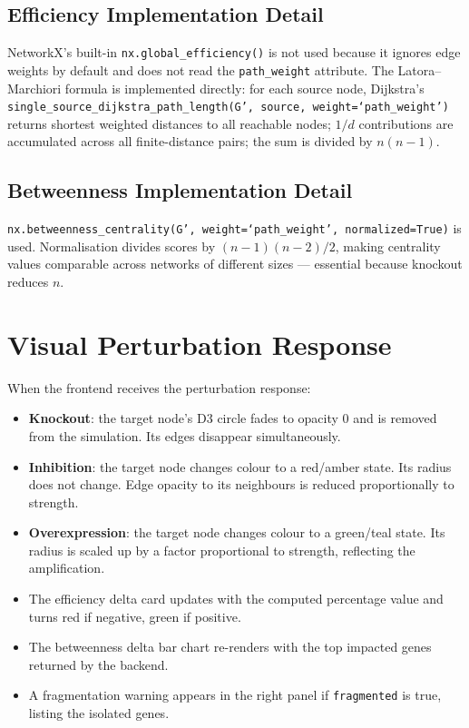 \documentclass[12pt,a4paper]{report}
\begin{document}
\subsection{Efficiency Implementation Detail}

NetworkX's built-in \texttt{nx.global\_efficiency()} is not used because it ignores edge weights by default and does not read the \texttt{path\_weight} attribute. The Latora--Marchiori formula is implemented directly: for each source node, Dijkstra's \texttt{single\_source\_dijkstra\_path\_length(G', source, weight=`path\_weight')} returns shortest weighted distances to all reachable nodes; $1/d$ contributions are accumulated across all finite-distance pairs; the sum is divided by $n(n-1)$.

\subsection{Betweenness Implementation Detail}

\texttt{nx.betweenness\_centrality(G', weight=`path\_weight', normalized=True)} is used. Normalisation divides scores by $(n-1)(n-2)/2$, making centrality values comparable across networks of different sizes — essential because knockout reduces $n$.

\section{Visual Perturbation Response}

When the frontend receives the perturbation response:
\begin{itemize}
  \item \textbf{Knockout}: the target node's D3 circle fades to opacity 0 and is removed from the simulation. Its edges disappear simultaneously.
  \item \textbf{Inhibition}: the target node changes colour to a red/amber state. Its radius does not change. Edge opacity to its neighbours is reduced proportionally to strength.
  \item \textbf{Overexpression}: the target node changes colour to a green/teal state. Its radius is scaled up by a factor proportional to strength, reflecting the amplification.
  \item The efficiency delta card updates with the computed percentage value and turns red if negative, green if positive.
  \item The betweenness delta bar chart re-renders with the top impacted genes returned by the backend.
  \item A fragmentation warning appears in the right panel if \texttt{fragmented} is true, listing the isolated genes.
\end{itemize}
\end{document}
